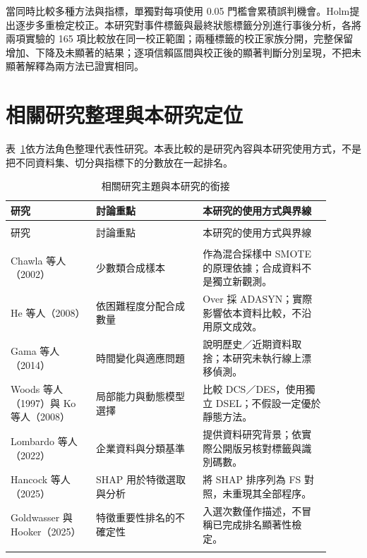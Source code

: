 當同時比較多種方法與指標，單獨對每項使用 0.05 門檻會累積誤判機會。Holm\autocite{holm1979multiple}提出逐步多重檢定校正。本研究對事件標籤與最終狀態標籤分別進行事後分析，各將兩項實驗的 165 項比較放在同一校正範圍；兩種標籤的校正家族分開，完整保留增加、下降及未顯著的結果；逐項信賴區間與校正後的顯著判斷分別呈現，不把未顯著解釋為兩方法已證實相同。

\section{相關研究整理與本研究定位}

表~\ref{tab:lit-position}依方法角色整理代表性研究。本表比較的是研究內容與本研究使用方式，不是把不同資料集、切分與指標下的分數放在一起排名。

\begingroup\small{}\setlength{\tabcolsep}{4pt}
\begin{longtable}{@{}>{\raggedright\arraybackslash}p{0.24\linewidth}>{\raggedright\arraybackslash}p{0.30\linewidth}>{\raggedright\arraybackslash}p{0.36\linewidth}@{}}
\caption{相關研究主題與本研究的銜接}\label{tab:lit-position}\\
\toprule
研究 & 討論重點 & 本研究的使用方式與界線 \\
\midrule\endfirsthead
\multicolumn{3}{c}{表~\thetable（續）}\\\toprule
研究 & 討論重點 & 本研究的使用方式與界線 \\
\midrule\endhead
\midrule\multicolumn{3}{r}{續下頁}\\\endfoot
\bottomrule\endlastfoot
Chawla 等人（2002）\autocite{chawla2002smote} & 少數類合成樣本 & 作為混合採樣中 SMOTE 的原理依據；合成資料不是獨立新觀測。 \\[4pt]
He 等人（2008）\autocite{he2008adasyn} & 依困難程度分配合成數量 & Over 採 ADASYN；實際影響依本資料比較，不沿用原文成效。 \\[4pt]
Gama 等人（2014）\autocite{gama2014drift} & 時間變化與適應問題 & 說明歷史／近期資料取捨；本研究未執行線上漂移偵測。 \\[4pt]
Woods 等人（1997）與 Ko 等人（2008）\autocite{woods1997local,ko2008dynamic} & 局部能力與動態模型選擇 & 比較 DCS／DES，使用獨立 DSEL；不假設一定優於靜態方法。 \\[4pt]
Lombardo 等人（2022）\autocite{lombardo2022bankruptcy} & 企業資料與分類基準 & 提供資料研究背景；依實際公開版另核對標籤與識別碼數。 \\[4pt]
Hancock 等人（2025）\autocite{hancock2025shapfs} & SHAP 用於特徵選取與分析 & 將 SHAP 排序列為 FS 對照，未重現其全部程序。 \\[4pt]
Goldwasser 與 Hooker（2025）\autocite{goldwasser2025rankings} & 特徵重要性排名的不確定性 & 入選次數僅作描述，不冒稱已完成排名顯著性檢定。 \\*
\end{longtable}
\endgroup

